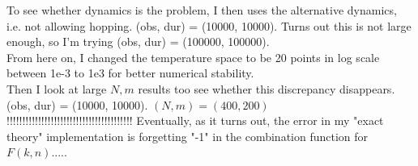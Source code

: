 \documentclass[12pt]{article}
\begin{document}
To see whether dynamics is the problem, I then uses the alternative dynamics, i.e. not allowing hopping. (obs, dur) = (10000, 10000). Turns out this is not large enough, so I'm trying (obs, dur) = (100000, 100000). \\

From here on, I changed the temperature space to be 20 points in log scale between 1e-3 to 1e3 for better numerical stability.\\


Then I look at large \(N,m\) results too see whether this discrepancy disappears. (obs, dur) = (10000, 10000). \((N,m) = (400, 200)\)\\

!!!!!!!!!!!!!!!!!!!!!!!!!!!!!!!!!!!!!!!!
Eventually, as it turns out, the error in my "exact theory" implementation is forgetting "-1" in the combination function for \(F(k,n)\).....
\end{document}
